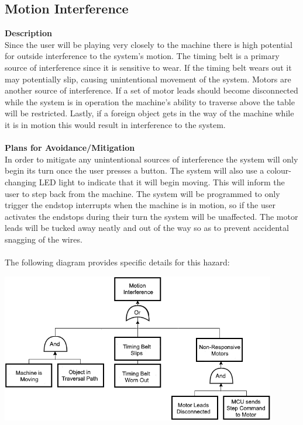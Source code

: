 \documentclass[titlepage]{article}
\begin{document}
\subsection{Motion Interference}
\textbf{Description}\\
Since the user will be playing very closely to the machine there is high potential for outside interference to the system's motion. The timing belt is a primary source of interference since it is sensitive to wear. If the timing belt wears out it may potentially slip, causing unintentional movement of the system. Motors are another source of interference. If a set of motor leads should become disconnected while the system is in operation the machine's ability to traverse above the table will be restricted. Lastly, if a foreign object gets in the way of the machine while it is in motion this would result in interference to the system. \\~\\
\textbf{Plans for Avoidance/Mitigation}\\
In order to mitigate any unintentional sources of interference the system will only begin its turn once the user presses a button. The system will also use a colour-changing LED light to indicate that it will begin moving. This will inform the user to step back from the machine. The system will be programmed to only trigger the endstop interrupts when the machine is in motion, so if the user activates the endstops during their turn the system will be unaffected. The motor leads will be tucked away neatly and out of the way so as to prevent accidental snagging of the wires. \\~\\
The following diagram provides specific details for this hazard:
\begin{center}
	\includegraphics[width=0.9\textwidth]{MotionInterferenceFTA.png}
\label{fig:yRailFig}
\end{center}
\end{document}

